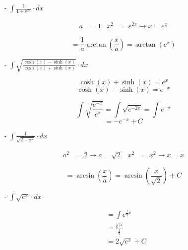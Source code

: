 \documentclass{report}
\begin{document}
  \begin{itemize}

    \item[-] $\displaystyle{\int \frac{1}{1 + e^{2x}} \cdot dx}$

      \begin{align*}
        a & = 1 & x^2 & = e^{2x} \to x = e^x
      \end{align*}

      \[= \frac{1}{a} \arctan(\frac{x}{a}) = \arctan(e^{x})\]

  \end{itemize}

  \newpage

  \begin{itemize}
    \item[-] $\displaystyle{\int \sqrt{\frac{\cosh(x) - \sinh(x)}{\cosh(x) + \sinh(x)}} \cdot dx}$

      \[\cosh(x) + \sinh(x) = e^x\]
      \[\cosh(x) - \sinh(x) = e^{-x}\]

      \[\int \sqrt{\frac{e^{-x}}{e^x}} = \int \sqrt{e^{-2x}} = \int e^{-x}\]
      \[= -e^{-x} + C\]

  \end{itemize}

  \newpage

  \begin{itemize}
    \item[-] $\displaystyle{\int \frac{1}{\sqrt{2 - x^2}} \cdot dx}$

      \begin{align*}
        a^2 & = 2 \to a = \sqrt{2} & x^2 & = x^2 \to x = x
      \end{align*}

      \[= \arcsin(\frac{x}{a}) = \arcsin(\frac{x}{\sqrt{2}}) + C\]

  \end{itemize}

  \newpage

  \begin{itemize}
    \item[-] $\displaystyle{\int \sqrt{e^x} \cdot dx}$

      \begin{align*}
        &= \int e^{\frac{1}{2}x}\\ &= \frac{e^{\frac{1}{2}x}}{\frac{1}{2}}\\ &= 2 \sqrt{e^x} + C
      \end{align*}

  \end{itemize}
\end{document}
